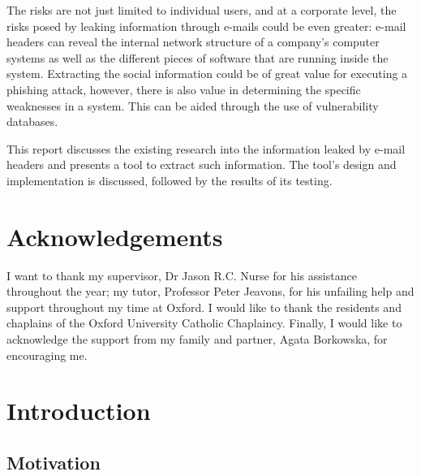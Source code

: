 \documentclass[a4paper,DIV=12,BCOR=7mm,abstract=yes,twoside,11pt]{scrreprt}
\begin{document}
The risks are not just limited to individual users, and at a corporate level,
the risks posed by leaking information through e-mails could be even greater:
e-mail headers can reveal the internal network structure of a company's
computer systems as well as the different pieces of software that are running
inside the system.  Extracting the social information could be of great value
for executing a phishing attack, however, there is also value in determining
the specific weaknesses in a system.  This can be aided through the use of
vulnerability databases.

This report discusses the existing research into the information leaked by
e-mail headers and presents a tool to extract such information.  The tool's
design and implementation is discussed, followed by the results of its testing.

\cleardoublepage 
\chapter*{Acknowledgements}

I want to thank my supervisor, Dr Jason R.C. Nurse for his assistance
throughout the year; my tutor, Professor Peter Jeavons, for his unfailing
help and support throughout my time at Oxford.  I would like to thank the
residents and chaplains of the Oxford University Catholic Chaplaincy.
Finally, I would like to acknowledge the support from my family and
partner, Agata Borkowska, for encouraging me.

\cleardoublepage 
\tableofcontents 
\clearpage
\let\LaTeXStandardClearpage\clearpage
\let\clearpage\relax  %

\listoftables \listoffigures \listofalgorithms

\let\clearpage\LaTeXStandardClearpage %


\cleardoublepage 
\chapter{Introduction}\label{chap:int}
\setcounter{page}{1}

\section{Motivation}
\end{document}
